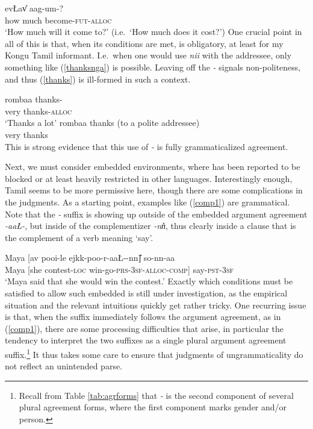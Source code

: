 \documentclass[output=paper, modfonts, nonflat]{langsci/langscibook}
\begin{document}
\ea\label{whquestion}\gll ev\L av\U{} aag-um-\nga?\\
{how much} become-\textsc{fut}-\textsc{alloc}\\
\glt `How much will it come to?' (i.e.\ `How much does it cost?')
\z
%
One crucial point in all of this is that, when its conditions are met,
\allagr{} is obligatory, at least for my Kongu Tamil informant.  I.e.\
when one would use \textit{nii\nga} with the addressee, only something
like (\ref{thanksnga}) is possible. Leaving off the \textit{-\nga}
signals non-politeness, and thus (\ref{thanks}) is ill-formed in such
a context.

\ea\label{oblig}
 \ea
   \label{thanksnga}\gll rombaa thanks-\nga\\
   very thanks-\textsc{alloc}{}\\
   \glt `Thanks a lot'
 \ex
   \label{thanks}\gll *rombaa thanks (to a polite addressee)\\
   very thanks\\
 \z
\z
%
This is strong evidence that this use of \textit{-\nga} is fully
grammaticalized agreement.


Next, we must consider embedded environments, where \allagr{} has been
reported to be blocked or at least heavily restricted in other
languages. Interestingly enough, Tamil seems to be more permissive
here, though there are some complications in the judgments. As a
starting point, examples like (\ref{comp1}) are grammatical. Note that
the \textit{-\nga} suffix is showing up outside of the embedded
argument agreement \textit{-aa\L-}, but inside of the complementizer
\textit{-nn\U}, thus clearly inside a clause that is the complement of
a verb meaning `say'.  

\ea\label{comp1}\gll Maya [av\A{} poo\textrtailt\textrtailt i-le \J
ejkk\A-poo-r-aa\L-\nga-nn\U] so-nn-aa\\  
Maya [she contest-\textsc{loc}{} win-go-\textsc{prs}-3\textsc{sf}-\textsc{alloc}-\textsc{comp}]
say-\textsc{pst}-3\textsc{sf}\\ 
\glt `Maya said that she would win the contest.'
\z
%
Exactly which conditions must be satisfied to allow such embedded
\allagr{} is still under investigation, as the empirical situation and
the relevant intuitions quickly get rather tricky. One recurring issue
is that, when the \allagr{} suffix immediately follows the argument
agreement, as in (\ref{comp1}), there are some processing difficulties
that arise, in particular the tendency to interpret the two suffixes
as a single plural argument agreement suffix.\footnote{Recall from
  Table \ref{tab:agrforms} that \textit{-\nga} is the second component
  of several plural agreement forms, where the first component marks
  gender and/or person.} It thus takes some care to ensure that
judgments of ungrammaticality do not reflect an unintended parse.
\end{document}
